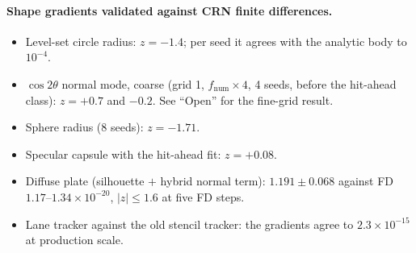 \documentclass[11pt,a4paper]{article}
\numberwithin{equation}{section}
\begin{document}
\paragraph{Shape gradients validated against CRN finite differences.}
\begin{itemize}
\item Level-set circle radius: $z = -1.4$; per seed it agrees with the analytic body
  to $10^{-4}$.
\item $\cos 2\theta$ normal mode, coarse (grid 1, $f_{\mathrm{num}}\times4$, 4 seeds, before
  the hit-ahead class): $z = +0.7$ and $-0.2$.  See ``Open'' for the fine-grid result.
\item Sphere radius (8 seeds): $z = -1.71$.
\item Specular capsule with the hit-ahead fit: $z = +0.08$.
\item Diffuse plate (silhouette $+$ hybrid normal term): $1.191\pm0.068$ against FD
  $1.17$--$1.34\times10^{-20}$, $|z|\le 1.6$ at five FD steps.
\item Lane tracker against the old stencil tracker: the gradients agree to
  $2.3\times10^{-15}$ at production scale.
\end{itemize}
\end{document}
